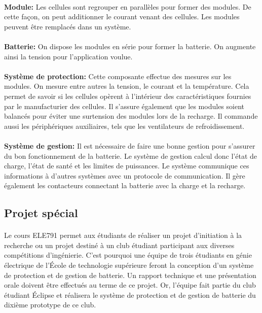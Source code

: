 		\paragraph{}   \textbf{Module:}
		 Les cellules sont regrouper en parallèles pour former des modules. De cette façon, on peut additionner le courant venant des cellules. Les modules peuvent être remplacés dans un système.
		
		\paragraph{}   \textbf{Batterie:}
		 On dispose les modules en série pour former la batterie. On augmente ainsi la tension pour l'application voulue.
		
		\paragraph{}   \textbf{Système de protection:}
		 Cette composante effectue des mesures sur les modules. On mesure entre autres la tension, le courant et la température. Cela permet de savoir si les cellules opèrent à l'intérieur des caractéristiques fournies par le manufacturier des cellules. Il s'assure également que les modules soient balancés pour éviter une surtension des modules lors de la recharge. Il commande aussi les périphériques auxiliaires, tels que les ventilateurs de refroidissement.
		
		\paragraph{}   \textbf{Système de gestion:}
		 Il est nécessaire de faire une bonne gestion pour s'assurer du bon fonctionnement de la batterie. Le système de gestion calcul donc l'état de charge, l'état de santé et les limites de puissances. Le système communique ces informations à d'autres systèmes avec un protocole de communication. Il gère également les contacteurs connectant la batterie avec la charge et la recharge.
	
	\subsection{Projet spécial}

		\paragraph{}
		Le cours ELE791 permet aux étudiants de réaliser un projet d'initiation à la recherche ou un projet destiné à un club étudiant participant aux diverses compétitions d'ingénierie. C'est pourquoi une équipe de trois étudiants en génie électrique de l'École de technologie supérieure feront la conception d'un système de protection et de gestion de batterie. Un rapport technique et une présentation orale doivent être effectués au terme de ce projet. Or, l'équipe fait partie du club étudiant Éclipse et réalisera le système de protection et de gestion de batterie du dixième prototype de ce club.
	
